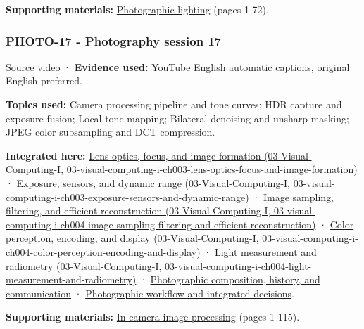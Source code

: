 \textbf{Supporting materials:} \href{https://drive.google.com/open?id=0B6w2XfPHEcZYN1dYTWZndkZDNVE}{Photographic lighting} (pages 1-72).

\subsubsection{PHOTO-17 - Photography session 17}\label{04-visual-computing-ii-ch036-photo-17---photography-session-17}

\href{https://www.youtube.com/watch?v=Jb4ojXL3xcA}{Source video} · \textbf{Evidence used:} YouTube English automatic captions, original English preferred.

\textbf{Topics used:} Camera processing pipeline and tone curves; HDR capture and exposure fusion; Local tone mapping; Bilateral denoising and unsharp masking; JPEG color subsampling and DCT compression.

\textbf{Integrated here:} \href{../03-Visual-Computing-I/main.pdf\#nameddest=03-visual-computing-i-ch003-lens-optics-focus-and-image-formation}{Lens optics, focus, and image formation (03-Visual-Computing-I, 03-visual-computing-i-ch003-lens-optics-focus-and-image-formation)} · \href{../03-Visual-Computing-I/main.pdf\#nameddest=03-visual-computing-i-ch003-exposure-sensors-and-dynamic-range}{Exposure, sensors, and dynamic range (03-Visual-Computing-I, 03-visual-computing-i-ch003-exposure-sensors-and-dynamic-range)} · \href{../03-Visual-Computing-I/main.pdf\#nameddest=03-visual-computing-i-ch004-image-sampling-filtering-and-efficient-reconstruction}{Image sampling, filtering, and efficient reconstruction (03-Visual-Computing-I, 03-visual-computing-i-ch004-image-sampling-filtering-and-efficient-reconstruction)} · \href{../03-Visual-Computing-I/main.pdf\#nameddest=03-visual-computing-i-ch004-color-perception-encoding-and-display}{Color perception, encoding, and display (03-Visual-Computing-I, 03-visual-computing-i-ch004-color-perception-encoding-and-display)} · \href{../03-Visual-Computing-I/main.pdf\#nameddest=03-visual-computing-i-ch004-light-measurement-and-radiometry}{Light measurement and radiometry (03-Visual-Computing-I, 03-visual-computing-i-ch004-light-measurement-and-radiometry)} · \hyperref[04-visual-computing-ii-ch034-photographic-composition-history-and-communication]{Photographic composition, history, and communication} · \hyperref[04-visual-computing-ii-ch034-photographic-workflow-and-integrated-decisions]{Photographic workflow and integrated decisions}.

\textbf{Supporting materials:} \href{https://drive.google.com/open?id=0B6w2XfPHEcZYeTFKZWhndVBOYTA}{In-camera image processing} (pages 1-115).

